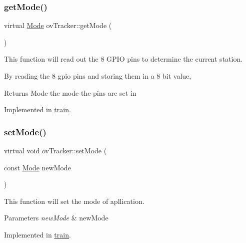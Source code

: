 \subsubsection{\texorpdfstring{get\+Mode()}{getMode()}}
{\footnotesize\ttfamily virtual \hyperlink{stations_8h_ad03936209251465257e0fdcfb33dbf91}{Mode} ov\+Tracker\+::get\+Mode (\begin{DoxyParamCaption}{ }\end{DoxyParamCaption})\hspace{0.3cm}{\ttfamily [pure virtual]}}



This function will read out the 8 G\+P\+IO pins to determine the current station. 

By reading the 8 gpio pins and storing them in a 8 bit value, \begin{DoxyReturn}{Returns}
Mode the mode the pins are set in 
\end{DoxyReturn}


Implemented in \hyperlink{classtrain_ae788938711f5940abc9ad9fa09a77011}{train}.

\mbox{\label{classovTracker_a776f469f9db184664e4f4425cca2df32}} 
\subsubsection{\texorpdfstring{set\+Mode()}{setMode()}}
{\footnotesize\ttfamily virtual void ov\+Tracker\+::set\+Mode (\begin{DoxyParamCaption}\item[{const \hyperlink{stations_8h_ad03936209251465257e0fdcfb33dbf91}{Mode}}]{new\+Mode }\end{DoxyParamCaption})\hspace{0.3cm}{\ttfamily [pure virtual]}}



This function will set the mode of apllication. 


\begin{DoxyParams}{Parameters}
{\em new\+Mode} & new\+Mode \\
\hline
\end{DoxyParams}


Implemented in \hyperlink{classtrain_ae4cd3a06c0b736f2de38dd7987e9576e}{train}.

\mbox{\label{classovTracker_a9611f8fe5ed1937262ebcd89bd7ee617}} 
